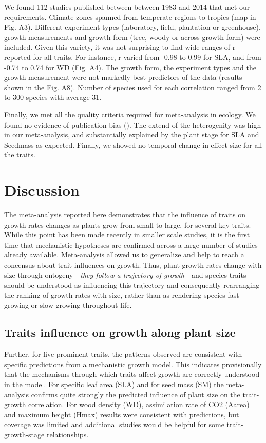 \documentclass[a4paper]{article}\usepackage[]{graphicx}\usepackage[]{color}
\begin{document}
We found 112 studies published between between 1983 and 2014 that met our requirements. Climate zones spanned from temperate regions to  tropics (map in Fig. A3). Different experiment types (laboratory, field, plantation or greenhouse), growth measurements and growth form (tree, woody or across growth form) were included. Given this variety, it was not surprising to find wide ranges of r reported for all traits. For instance, r varied from -0.98 to 0.99 for SLA, and from -0.74 to 0.74 for WD (Fig. A4). The growth form, the experiment types and the growth measurement were not markedly best predictors of the data (results shown in the Fig. A8). Number of species used for each correlation ranged from 2 to 300 species with average 31. 

Finally, we met all the quality criteria required for meta-analysis in ecology. We found no evidence of publication bias (). The extend of the heterogenity was high in our meta-analysis, and substantially explained by the plant stage for SLA and Seedmass as expected. Finally, we showed no temporal change in effect size for all the traits.


\section*{Discussion}\label{discussion}

The meta-analysis reported here demonstrates that the influence of traits on growth rates changes as plants grow from small to large, for several key traits. While this point has been made recently in smaller scale studies, it is the first time that mechanistic hypotheses are confirmed across a large number of studies already available. Meta-analysis allowed us to generalize and help to reach a concensus about trait influences on growth. Thus, plant growth rates change with size through ontogeny \citep{Condit:1993hd, Clark:1999ed, Herault:2011dd} - \textit{they follow a trajectory of growth} - and species traits should be understood as influencing this trajectory and consequently rearranging the ranking of growth rates with size, rather than as rendering species fast-growing or slow-growing throughout life. 

\subsection*{Traits influence on growth along plant size}

Further, for five prominent traits, the patterns observed are consistent with specific predictions from a mechanistic growth model. This indicates provisionally that the mechanisms through which traits affect growth are correctly understood in the model. For specific leaf area (SLA) and for seed mass (SM) the meta-analysis confirms quite strongly the predicted influence of plant size on the trait-growth correlation. For wood density (WD), assimilation rate of CO2 (Aarea) and maximum height (Hmax) results were consistent with predictions, but coverage was limited and additional studies would be helpful for some trait-growth-stage relationships. 
\end{document}
